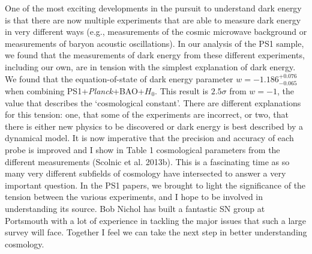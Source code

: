 \documentclass[12pt,preprint]{aastex}
\begin{document}
One of the most exciting developments in the pursuit to understand dark energy is that there are now multiple experiments that are able to measure dark energy in very different ways (e.g., measurements of the cosmic microwave background or measurements of baryon acoustic oscillations).  In our analysis of the PS1 sample, we found that the measurements of dark energy from these different experiments, including our own, are in tension with the simplest explanation of dark energy.  We found that the equation-of-state of dark energy parameter $w=-1.186^{+0.076}_{-0.065}$ when combining PS1+\textit{Planck}+BAO+$H_0$.  This result is $2.5\sigma$ from $w=-1$, the value that describes the `cosmological constant'.  There are different explanations for this tension: one, that some of the experiments are incorrect, or two, that there is either new physics to be discovered or dark energy is best described by a dynamical model. It is now imperative that the precision and accuracy of each probe is improved and I show in Table 1 cosmological parameters from the different measurements (Scolnic et al. 2013b).  This is a fascinating time as so many very different subfields of cosmology have intersected to answer a very important question.  In the PS1 papers, we brought to light  the significance of the tension between the various experiments, and I hope to be involved in understanding its source.  Bob Nichol has built a fantastic SN group at Portsmouth with a lot of experience in tackling the major issues that such a large survey will face.  Together I feel we can take the next step in better understanding cosmology.
\end{document}
